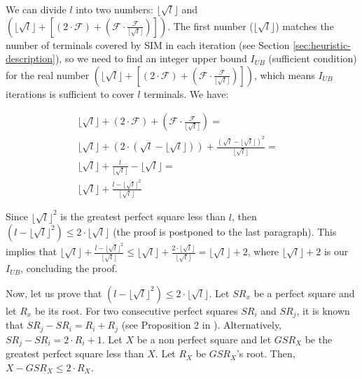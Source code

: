 \begin{Proof}
We can divide $l$ into two numbers: $\lfloor\sqrt{l}\rfloor$ and $(\lfloor\sqrt{l}\rfloor + [(2 \cdot \mathcal{F}) + (\mathcal{F} \cdot \frac{\mathcal{F}}{\lfloor\sqrt{l}\rfloor})])$. 
The first number ($\lfloor\sqrt{l}\rfloor$) matches the number of terminals covered by SIM in each iteration (see Section \ref{sec:heuristic-description}), so we need 
to find an integer upper bound $I_{UB}$ (sufficient condition) for the real number $(\lfloor\sqrt{l}\rfloor + [(2 \cdot \mathcal{F}) + (\mathcal{F} \cdot \frac{\mathcal{F}}{\lfloor\sqrt{l}\rfloor})])$, 
which means $I_{UB}$ iterations is sufficient to cover $l$ terminals. 
We have:

\begin{align*}
 \lfloor\sqrt{l}\rfloor + (2 \cdot \mathcal{F}) + (\mathcal{F} \cdot \frac{\mathcal{F}}{\lfloor\sqrt{l}\rfloor}) =& \\
 \lfloor\sqrt{l}\rfloor + (2 \cdot (\sqrt{l} - \lfloor\sqrt{l}\rfloor)) + \frac{(\sqrt{l} - \lfloor\sqrt{l}\rfloor)^2}{\lfloor\sqrt{l}\rfloor} =& \\
 \lfloor\sqrt{l}\rfloor + \frac{l}{\lfloor\sqrt{l}\rfloor} - \lfloor\sqrt{l}\rfloor =& \\
 \lfloor\sqrt{l}\rfloor + \frac{l - {\lfloor\sqrt{l}\rfloor}^{2}}{\lfloor\sqrt{l}\rfloor}
\end{align*}

Since ${\lfloor\sqrt{l}\rfloor}^{2}$ is the greatest perfect square less than $l$, then $(l - {\lfloor\sqrt{l}\rfloor}^{2}) \le 2 \cdot \lfloor\sqrt{l}\rfloor$ (the proof is postponed to the last paragraph). 
This implies that $\lfloor\sqrt{l}\rfloor + \frac{l - {\lfloor\sqrt{l}\rfloor}^{2}}{\lfloor\sqrt{l}\rfloor} \le \lfloor\sqrt{l}\rfloor + \frac{2 \cdot \lfloor\sqrt{l}\rfloor}{\lfloor\sqrt{l}\rfloor} = \lfloor\sqrt{l}\rfloor + 2$, 
where $\lfloor\sqrt{l}\rfloor + 2$ is our $I_{UB}$, concluding the proof.

  Now, let us prove that $(l - {\lfloor\sqrt{l}\rfloor}^{2}) \le 2 \cdot \lfloor\sqrt{l}\rfloor$. Let $SR_{x}$ be a perfect square and let $R_x$ be its root. For two consecutive perfect squares $SR_{i}$ and $SR_{j}$, it is known that $SR_{j} - SR_{i} = R_i + R_j$ (see Proposition 2 in \cite{Fibonacci1987}). 
Alternatively, $SR_{j} - SR_{i} = 2 \cdot R_i + 1$. Let $X$ be a non perfect square and let $GSR_{X}$ be the greatest perfect square less than $X$. 
Let $R_{X}$ be $GSR_{X}$'s root. Then, $X - GSR_{X} \le 2 \cdot R_{X}$. 

  \end{Proof}

